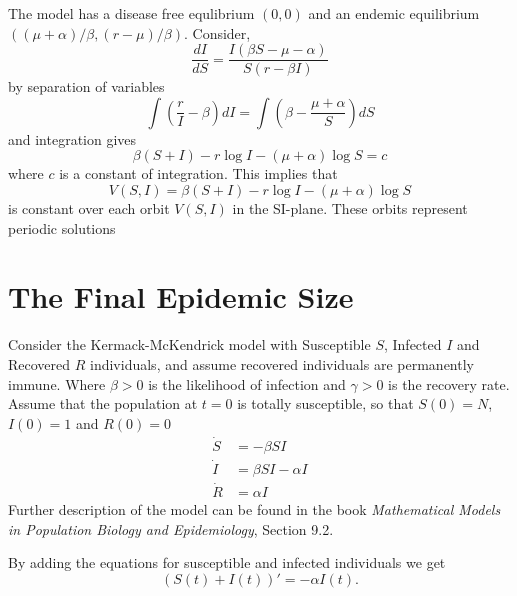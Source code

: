 \documentclass{book}
\begin{document}
The model has a disease free equlibrium $(0,0)$ and an endemic equilibrium $((\mu+\alpha) / \beta,(r-\mu) / \beta)$. Consider, 
\begin{equation}
\frac{d I}{d S}=\frac{I(\beta S-\mu-\alpha)}{S(r-\beta I)}
\end{equation}
by separation of variables
\begin{equation}
\int\left(\frac{r}{I}-\beta\right) d I=\int\left(\beta-\frac{\mu+\alpha}{S}\right) d S
\end{equation}
and integration gives
\begin{equation}
\beta(S+I)-r \log I-(\mu+\alpha) \log S=c
\end{equation}
where $c$ is a constant of integration. This implies that
\begin{equation}
V(S,I)=\beta(S+I)-r \log I-(\mu+\alpha) \log S
\end{equation}
is constant over each orbit $V(S,I)$ in the SI-plane. These orbits represent periodic solutions


    

\chapter{The Final Epidemic Size}
\label{chapt:finsize}

Consider the Kermack-McKendrick model with Susceptible $S$, Infected $I$ and Recovered $R$ individuals, and assume recovered individuals are permanently immune. Where $\beta>0$ is the likelihood of infection and $\gamma>0$ is the recovery rate.
Assume that the population at $t=0$ is totally susceptible, so that $S(0)=N$, $I(0)=1$ and $R(0)=0$
\begin{align*}
\dot{S} &= -\beta S I\\
 \dot{I} &= \beta S I -\alpha I\\
 \dot{R} &= \alpha I
\end{align*}
%
Further description of the model can be found in the book {\it Mathematical Models in Population Biology and Epidemiology}, Section 9.2.

By adding the equations for susceptible and infected individuals we get
\begin{equation} \label{eq:fun1}
(S(t)+I(t))'=-\alpha I(t).
\end{equation}
\end{document}
